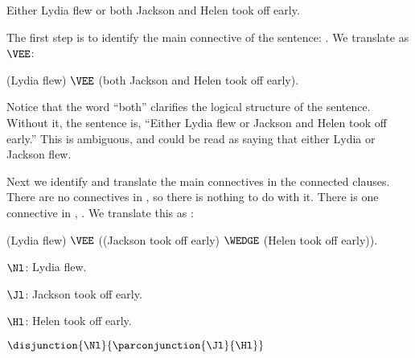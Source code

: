 \begin{majorILnc}{} %
	\begin{menumerate}
		\item\label{GSLTransSentenceE} Either Lydia flew or both Jackson and Helen took off early.
	\end{menumerate} 
	The first step is to identify the main connective of the sentence: .
	We translate  as $\VEE$: 
	\begin{menumerate}
		\item\label{GSLTransSentenceF} (Lydia flew) $\VEE$ (both Jackson and Helen took off early).
	\end{menumerate}
	Notice that the word ``both'' clarifies the logical structure of the sentence.
	Without it, the sentence is, ``Either Lydia flew or Jackson and Helen took off early.''
	This is ambiguous, and could be read as saying that either Lydia or Jackson flew. 
	
	Next we identify and translate the main connectives in the connected clauses. 
	There are no connectives in , so there is nothing to do with it. 
	There is one connective in , . 
	We translate this as \mention{$\WEDGE$}:  
	\begin{menumerate}
		\item\label{GSLTransSentenceG} (Lydia flew) $\VEE$ ((Jackson took off early) $\WEDGE$ (Helen took off early)).
	\end{menumerate}
	\begin{description}[itemsep=0em]
		\item[Translation Key:] \hfill{} 
		\begin{description}[itemsep=0em]
			\item[] $\Nl$: Lydia flew.
			\item[] $\Jl$: Jackson took off early. 
			\item[] $\Hl$: Helen took off early. 
		\end{description}
	\end{description}
	\begin{menumerate}
		\item\label{GSLTransSentenceH} $\disjunction{\Nl}{\parconjunction{\Jl}{\Hl}}$
	\end{menumerate}
\end{majorILnc}


